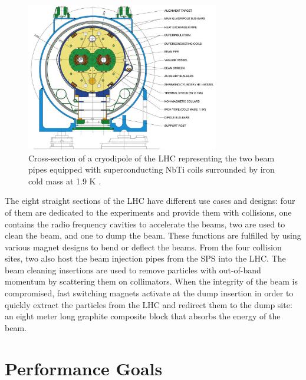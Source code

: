     \begin{figure}[t!]
			\centering
			\includegraphics[width=0.75\textwidth]{img/I-2-LHC/magnet.jpg}
			\caption{Cross-section of a cryodipole of the LHC representing the two beam pipes equipped with superconducting NbTi coils surrounded by iron cold mass at 1.9 K \cite{Evans:2008zzb}.}
			\label{fig:I-2-magnet}
		\end{figure}

    The eight straight sections of the LHC have different use cases and designs: four of them are dedicated to the experiments and provide them with collisions, one contains the radio frequency cavities to accelerate the beams, two are used to clean the beam, and one to dump the beam. These functions are fulfilled by using various magnet designs to bend or deflect the beams. From the four collision sites, two also host the beam injection pipes from the SPS into the LHC. The beam cleaning insertions are used to remove particles with out-of-band momentum by scattering them on collimators. When the integrity of the beam is compromised, fast switching magnets activate at the dump insertion in order to quickly extract the particles from the LHC and redirect them to the dump site: an eight meter long graphite composite block that absorbs the energy of the beam.

	\section{Performance Goals}


